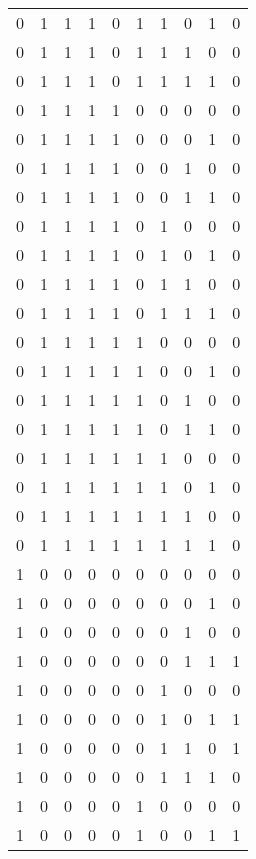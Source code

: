 \begin{longtable}[c]{rrrrrrrrrr}
        0 & 1 & 1 & 1 & 0 & 1 & 1 & 0 & 1 & 0 \\
        0 & 1 & 1 & 1 & 0 & 1 & 1 & 1 & 0 & 0 \\
        0 & 1 & 1 & 1 & 0 & 1 & 1 & 1 & 1 & 0 \\
        0 & 1 & 1 & 1 & 1 & 0 & 0 & 0 & 0 & 0 \\
        0 & 1 & 1 & 1 & 1 & 0 & 0 & 0 & 1 & 0 \\
        0 & 1 & 1 & 1 & 1 & 0 & 0 & 1 & 0 & 0 \\
        0 & 1 & 1 & 1 & 1 & 0 & 0 & 1 & 1 & 0 \\
        0 & 1 & 1 & 1 & 1 & 0 & 1 & 0 & 0 & 0 \\
        0 & 1 & 1 & 1 & 1 & 0 & 1 & 0 & 1 & 0 \\
        0 & 1 & 1 & 1 & 1 & 0 & 1 & 1 & 0 & 0 \\
        0 & 1 & 1 & 1 & 1 & 0 & 1 & 1 & 1 & 0 \\
        0 & 1 & 1 & 1 & 1 & 1 & 0 & 0 & 0 & 0 \\
        0 & 1 & 1 & 1 & 1 & 1 & 0 & 0 & 1 & 0 \\
        0 & 1 & 1 & 1 & 1 & 1 & 0 & 1 & 0 & 0 \\
        0 & 1 & 1 & 1 & 1 & 1 & 0 & 1 & 1 & 0 \\
        0 & 1 & 1 & 1 & 1 & 1 & 1 & 0 & 0 & 0 \\
        0 & 1 & 1 & 1 & 1 & 1 & 1 & 0 & 1 & 0 \\
        0 & 1 & 1 & 1 & 1 & 1 & 1 & 1 & 0 & 0 \\
        0 & 1 & 1 & 1 & 1 & 1 & 1 & 1 & 1 & 0 \\
        1 & 0 & 0 & 0 & 0 & 0 & 0 & 0 & 0 & 0 \\
        1 & 0 & 0 & 0 & 0 & 0 & 0 & 0 & 1 & 0 \\
        1 & 0 & 0 & 0 & 0 & 0 & 0 & 1 & 0 & 0 \\
        1 & 0 & 0 & 0 & 0 & 0 & 0 & 1 & 1 & 1 \\
        1 & 0 & 0 & 0 & 0 & 0 & 1 & 0 & 0 & 0 \\
        1 & 0 & 0 & 0 & 0 & 0 & 1 & 0 & 1 & 1 \\
        1 & 0 & 0 & 0 & 0 & 0 & 1 & 1 & 0 & 1 \\
        1 & 0 & 0 & 0 & 0 & 0 & 1 & 1 & 1 & 0 \\
        1 & 0 & 0 & 0 & 0 & 1 & 0 & 0 & 0 & 0 \\
        1 & 0 & 0 & 0 & 0 & 1 & 0 & 0 & 1 & 1 \\

\end{longtable}
